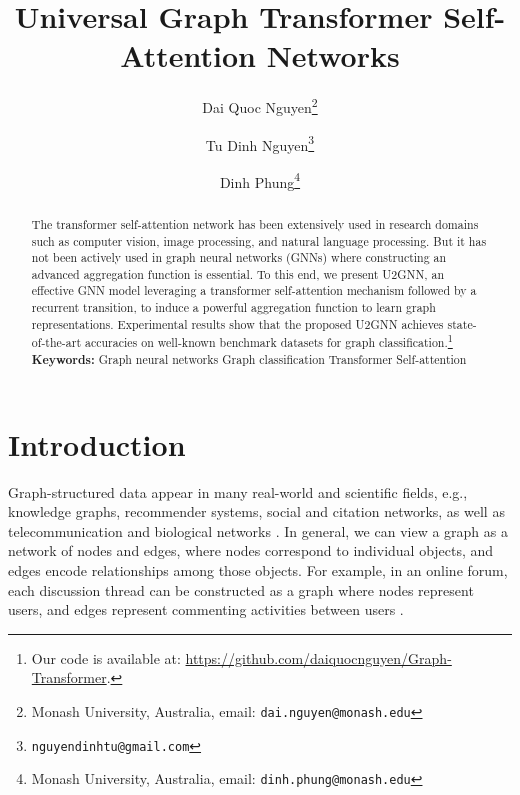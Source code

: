 \documentclass[twoside,leqno,twocolumn]{article}
\newcommand{\citep}{\cite}
\begin{document}
\title{Universal Graph Transformer Self-Attention Networks}

\author{Dai Quoc Nguyen\thanks{Monash University, Australia, email: {\tt dai.nguyen@monash.edu}} \and Tu Dinh Nguyen\thanks{{\tt nguyendinhtu@gmail.com}} \and Dinh Phung\thanks{Monash University, Australia, email: {\tt dinh.phung@monash.edu}}
}

\date{}

\maketitle

\begin{abstract}
The transformer self-attention network has been extensively used in research domains such as computer vision, image processing, and natural language processing. But it has not been actively used in graph neural networks (GNNs) where constructing an advanced aggregation function is essential. To this end, we present U2GNN, an effective GNN model leveraging a transformer self-attention mechanism followed by a recurrent transition, to induce a powerful aggregation function to learn graph representations. Experimental results show that the proposed U2GNN achieves state-of-the-art accuracies on well-known benchmark datasets for graph classification.\footnote{Our code is available at: \url{https://github.com/daiquocnguyen/Graph-Transformer}.}
\\

\noindent \textbf{Keywords:} Graph neural networks  Graph classification   Transformer  Self-attention


\end{abstract}

\section{Introduction}

Graph-structured data appear in many real-world and scientific fields, e.g., knowledge graphs, recommender systems,  social and citation networks, as well as telecommunication and biological networks \citep{battaglia2018relational,zhang2018deep}. 
In general, we can view a graph as a network of nodes and edges, where nodes correspond to individual objects, and edges encode relationships among those objects. 
For example, in an online forum, each discussion thread can be constructed as a graph where nodes represent users, and edges represent commenting activities between users \citep{yanardag2015deep}.
\end{document}
